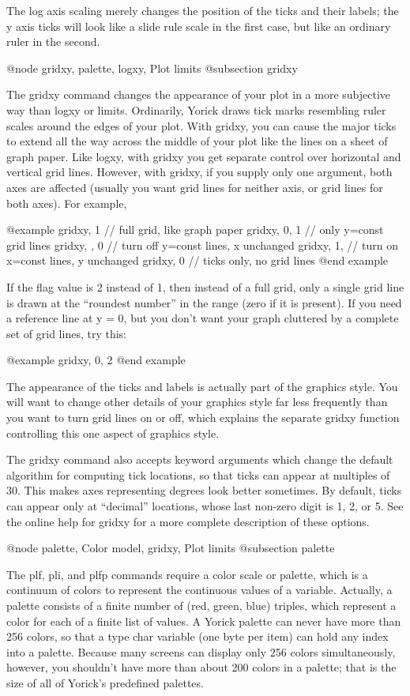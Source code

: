 The log axis scaling merely changes the position of the ticks and
their labels; the y axis ticks will look like a slide rule scale in
the first case, but like an ordinary ruler in the second.

@node gridxy, palette, logxy, Plot limits
@subsection gridxy

The gridxy command changes the appearance of your plot in a more
subjective way than logxy or limits.  Ordinarily, Yorick draws tick
marks resembling ruler scales around the edges of your plot.  With
gridxy, you can cause the major ticks to extend all the way across the
middle of your plot like the lines on a sheet of graph paper.  Like
logxy, with gridxy you get separate control over horizontal and
vertical grid lines.  However, with gridxy, if you supply only one
argument, both axes are affected (usually you want grid lines for
neither axis, or grid lines for both axes).  For example,

@example
gridxy, 1      // full grid, like graph paper
gridxy, 0, 1   // only y=const grid lines
gridxy, , 0    // turn off y=const lines, x unchanged
gridxy, 1,     // turn on x=const lines, y unchanged
gridxy, 0      // ticks only, no grid lines
@end example

If the flag value is 2 instead of 1, then instead of a full grid, only
a single grid line is drawn at the ``roundest number'' in the range
(zero if it is present).  If you need a reference line at y = 0, but
you don't want your graph cluttered by a complete set of grid lines,
try this:

@example
gridxy, 0, 2
@end example

The appearance of the ticks and labels is actually part of the
graphics style.  You will want to change other details of your
graphics style far less frequently than you want to turn grid lines on
or off, which explains the separate gridxy function controlling this
one aspect of graphics style.

The gridxy command also accepts keyword arguments which change the
default algorithm for computing tick locations, so that ticks can appear
at multiples of 30.  This makes axes representing degrees look better
sometimes.  By default, ticks can appear only at ``decimal'' locations,
whose last non-zero digit is 1, 2, or 5.  See the online help for gridxy
for a more complete description of these options.

@node palette, Color model, gridxy, Plot limits
@subsection palette

The plf, pli, and plfp commands require a color scale or palette,
which is a continuum of colors to represent the continuous values of a
variable.  Actually, a palette consists of a finite number of (red,
green, blue) triples, which represent a color for each of a finite
list of values.  A Yorick palette can never have more than 256 colors,
so that a type char variable (one byte per item) can hold any index
into a palette.  Because many screens can display only 256 colors
simultaneously, however, you shouldn't have more than about 200 colors
in a palette; that is the size of all of Yorick's predefined palettes.

